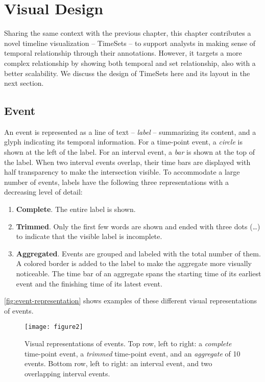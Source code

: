 \section{Visual Design}
Sharing the same context with the previous chapter, this chapter contributes a novel timeline visualization -- TimeSets -- to support analysts in making sense of temporal relationship through their annotations. However, it targets a more complex relationship by showing both temporal and set relationship, also with a better scalability. We discuss the design of TimeSets here and its layout in the next section.

\subsection{Event}
An event is represented as a line of text -- \emph{label} -- summarizing its content, and a glyph indicating its temporal information. For a time-point event, a \emph{circle} is shown at the left of the label. For an interval event, a \emph{bar} is shown at the top of the label. When two interval events overlap, their time bars are displayed with half transparency to make the intersection visible. To accommodate a large number of events, labels have the following three representations with a decreasing level of detail:
\begin{enumerate}
	\item \textbf{Complete}. The entire label is shown.
	\item \textbf{Trimmed}. Only the first few words are shown and ended with three dots (\dots) to indicate that the visible label is incomplete.
	\item \textbf{Aggregated}. Events are grouped and labeled with the total number of them. A colored border is added to the label to make the aggregate more visually noticeable. The time bar of an aggregate spans the starting time of its earliest event and the finishing time of its latest event.
\end{enumerate}

\autoref{fig:event-representation} shows examples of these different visual representations of events.

\begin{figure}[!htb]
\centering
\texttt{[image: figure2]}
\caption[Visual representations of events]{Visual representations of events. Top row, left to right: a \emph{complete} time-point event, a \emph{trimmed} time-point event, and an \emph{aggregate} of 10 events. Bottom row, left to right: an interval event, and two overlapping interval events.}
\label{fig:event-representation}
\end{figure}

